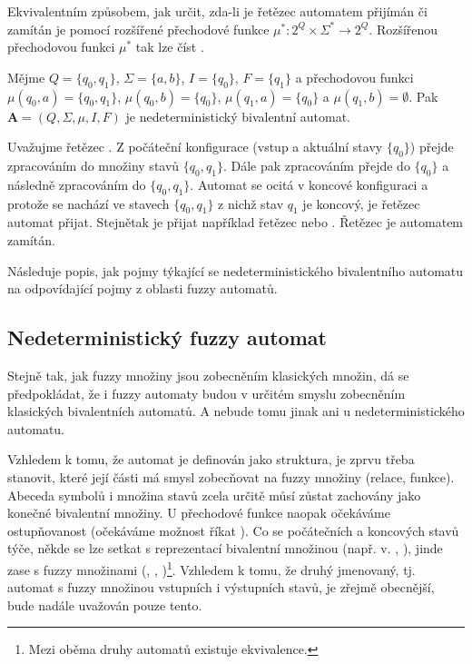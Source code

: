 \documentclass[a4paper,10pt]{article}
\begin{document}
Ekvivalentním způsobem, jak určit, zda-li je řetězec automatem přijímán či zamítán je pomocí rozšířené přechodové funkce $\mu^*: 2^Q \times \Sigma^* \rightarrow 2^Q$. Rozšířenou přechodovou funkci $\mu^*$ tak lze číst .

\begin{example}
 Mějme $Q = \{ q_0, q_1 \}$, $\Sigma = \{ a, b \}$, $I = \{ q_0 \}$, $F = \{ q_1 \}$ a přechodovou funkci $\mu(q_0, a) = \{ q_0, q_1 \}$, $\mu(q_0, b) = \{ q_0 \}$, $\mu(q_1, a) = \{ q_0 \}$ a $\mu(q_1, b) = \emptyset $. Pak $\mathbf{A} = (Q, \Sigma, \mu, I, F)$ je nedeterministický bivalentní automat.
 
 Uvažujme řetězec . Z počáteční konfigurace (vstup  a aktuální stavy $\{ q_0 \}$) přejde zpracováním  do množiny stavů $\{ q_0, q_1 \}$. Dále pak zpracováním  přejde do $\{ q_0 \}$ a následně zpracováním  do $\{ q_0, q_1 \}$. Automat se ocitá v koncové konfiguraci a protože se nachází ve stavech $\{ q_0, q_1 \}$ z nichž stav $q_1$ je koncový, je řetězec  automat přijat. Stejnětak je přijat například řetězec  nebo . Řetězec  je automatem zamítán.
\end{example}

Následuje popis, jak pojmy týkající se nedeterministického bivalentního automatu  na odpovídající pojmy z oblasti fuzzy automatů. 

\subsection{Nedeterministický fuzzy automat}
Stejně tak, jak fuzzy množiny jsou zobecněním klasických  množin, dá se předpokládat, že i fuzzy automaty budou v určitém smyslu zobecněním klasických bivalentních automatů. A nebude tomu jinak ani u nedeterministického automatu.

Vzhledem k tomu, že automat je definován jako struktura, je zprvu třeba stanovit, které její části má smysl zobecňovat na fuzzy množiny (relace, funkce). Abeceda symbolů i množina stavů zcela určitě můsí zůstat zachovány jako konečné bivalentní množiny. U přechodové funkce naopak očekáváme ostupňovanost (očekáváme možnost říkat ). Co se počátečních a koncových stavů týče, někde se lze setkat s reprezentací bivalentní množinou (např. v. \cite{AndAbdAsm-ApprPattMatcFuzzLog}, \cite{SnaKepAbrHas-AproxStriMatchFuzzAut}), jinde zase s fuzzy množinami (\cite{StaCir-ConsFuzzAutFuzzRegExp}, \cite{AstGariGonVillFar-ApprStrMatUsiDefFuzzAutLearExpr}, \cite{Bel-DetAndFuzzAut} \cite{GonGar-FuzzLangInfRanAccGuzzAutPumLemDetProc})\footnote{Mezi oběma druhy automatů existuje ekvivalence.}. Vzhledem k tomu, že druhý jmenovaný, tj. automat s fuzzy množinou vstupních i 
výstupních stavů, je zřejmě obecnější, bude nadále uvažován pouze tento.
\end{document}
